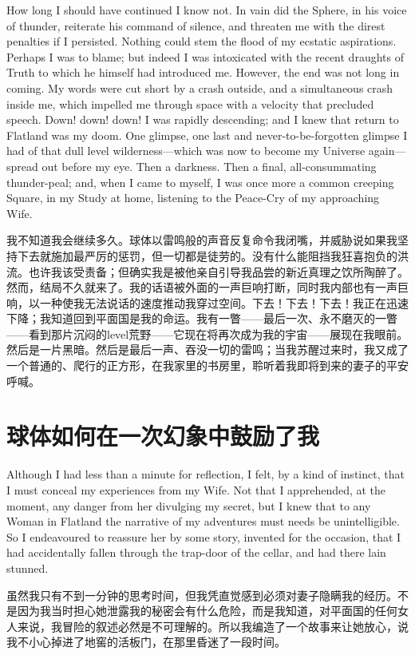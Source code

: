 \documentclass[12pt,UTF8]{ctexbook}
\begin{document}
How long I should have continued I know not. In vain did the Sphere, in his voice of thunder, reiterate his command of silence, and threaten me with the direst penalties if I persisted. Nothing could stem the flood of my ecstatic aspirations. Perhaps I was to blame; but indeed I was intoxicated with the recent draughts of Truth to which he himself had introduced me. However, the end was not long in coming. My words were cut short by a crash outside, and a simultaneous crash inside me, which impelled me through space with a velocity that precluded speech. Down! down! down! I was rapidly descending; and I knew that return to Flatland was my doom. One glimpse, one last and never-to-be-forgotten glimpse I had of that dull level wilderness---which was now to become my Universe again---spread out before my eye. Then a darkness. Then a final, all-consummating thunder-peal; and, when I came to myself, I was once more a common creeping Square, in my Study at home, listening to the Peace-Cry of my approaching Wife.

我不知道我会继续多久。球体以雷鸣般的声音反复命令我闭嘴，并威胁说如果我坚持下去就施加最严厉的惩罚，但一切都是徒劳的。没有什么能阻挡我狂喜抱负的洪流。也许我该受责备；但确实我是被他亲自引导我品尝的新近真理之饮所陶醉了。然而，结局不久就来了。我的话语被外面的一声巨响打断，同时我内部也有一声巨响，以一种使我无法说话的速度推动我穿过空间。下去！下去！下去！我正在迅速下降；我知道回到平面国是我的命运。我有一瞥——最后一次、永不磨灭的一瞥——看到那片沉闷的level荒野——它现在将再次成为我的宇宙——展现在我眼前。然后是一片黑暗。然后是最后一声、吞没一切的雷鸣；当我苏醒过来时，我又成了一个普通的、爬行的正方形，在我家里的书房里，聆听着我即将到来的妻子的平安呼喊。

\chapter{球体如何在一次幻象中鼓励了我}

Although I had less than a minute for reflection, I felt, by a kind of instinct, that I must conceal my experiences from my Wife. Not that I apprehended, at the moment, any danger from her divulging my secret, but I knew that to any Woman in Flatland the narrative of my adventures must needs be unintelligible. So I endeavoured to reassure her by some story, invented for the occasion, that I had accidentally fallen through the trap-door of the cellar, and had there lain stunned.

虽然我只有不到一分钟的思考时间，但我凭直觉感到必须对妻子隐瞒我的经历。不是因为我当时担心她泄露我的秘密会有什么危险，而是我知道，对平面国的任何女人来说，我冒险的叙述必然是不可理解的。所以我编造了一个故事来让她放心，说我不小心掉进了地窖的活板门，在那里昏迷了一段时间。
\end{document}
